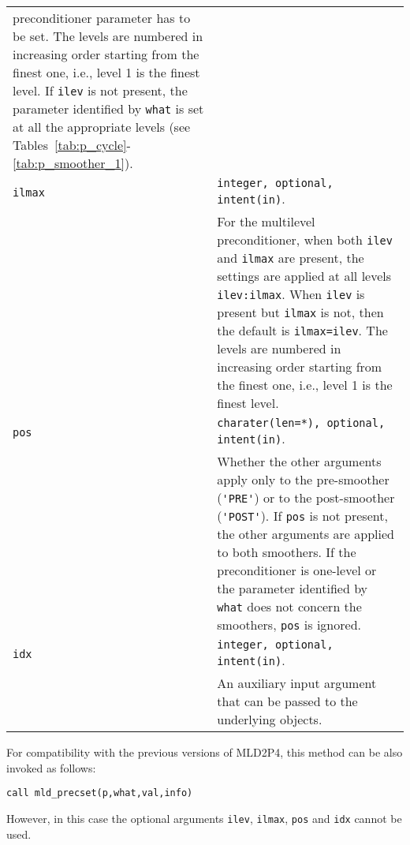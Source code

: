 \begin{tabular}{p{1.2cm}p{12cm}}
                preconditioner parameter has to be set.
                The levels are numbered in increasing
                order starting from the finest one, i.e., level 1 is the finest level.
                If \verb|ilev| is not present, the parameter identified by \verb|what|
                is set at all the appropriate levels (see
                Tables~\ref{tab:p_cycle}-\ref{tab:p_smoother_1}).\\
\verb|ilmax|   & \verb|integer, optional, intent(in)|.\\
              & For the multilevel preconditioner, when both
                \verb|ilev| and \verb|ilmax| are present, the settings
                are applied at all levels \verb|ilev:ilmax|. When
                \verb|ilev| is present but \verb|ilmax| is not, then
                the default is \verb|ilmax=ilev|.
                The levels are numbered in increasing
                order starting from the finest one, i.e., level 1 is the finest level. \\
\verb|pos|   & \verb|charater(len=*), optional, intent(in)|.\\
              & Whether the other arguments apply only to the pre-smoother (\verb|'PRE'|)
                or to the post-smoother (\verb|'POST'|). If \verb|pos| is not present,
                the other arguments are applied to both smoothers.
                If the preconditioner is one-level or the parameter identified by \verb|what|
                does not concern the smoothers, \verb|pos| is ignored.\\
\verb|idx|   & \verb|integer, optional, intent(in)|.\\
              & An auxiliary input argument that can be passed to the
                underlying objects.
\end{tabular}

\baselineskip
For compatibility with the previous versions of MLD2P4, this method can be also invoked
as follows:

\begin{center}
\verb|call mld_precset(p,what,val,info)|
\end{center}

\noindent
However, in this case the optional arguments \verb|ilev|,
\verb|ilmax|, \verb|pos| and \verb|idx|
cannot be used. \\

